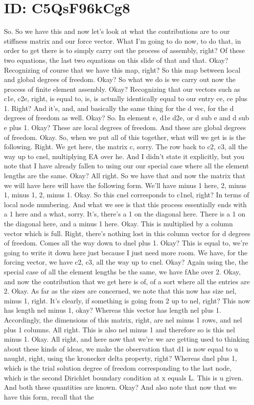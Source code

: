 \documentclass[10pt]{article}
\begin{document}
\section*{ID: C5QsF96kCg8}
So. So we have this and now let's look at what the contributions are to our stiffness matrix and our force vector. What I'm going to do now, to do that, in order to get there is to simply carry out the process of assembly, right? Of these two equations, the last two equations on this slide of that and that. Okay? Recognizing of course that we have this map, right? So this map between local and global degrees of freedom. Okay? So what we do is we carry out now the process of finite element assembly. Okay? Recognizing that our vectors such as c1e, c2e, right, is equal to, is, is actually identically equal to our entry ce, ce plus 1. Right? And it's, and, and basically the same thing for the d vec, for the d degrees of freedom as well. Okay? So. In element e, d1e d2e, or d sub e and d sub e plus 1. Okay? These are local degrees of freedom. And these are global degrees of freedom. Okay. So, when we put all of this together, what will we get is is the following. Right. We get here, the matrix c, sorry. The row back to c2, c3, all the way up to cnel, multiplying EA over he. And I didn't state it explicitly, but you note that I have already fallen to using our our special case where all the element lengths are the same. Okay? All right. So we have that and now the matrix that we will have here will have the following form. We'll have minus 1 here, 2, minus 1, minus 1, 2, minus 1. Okay.  So this cnel corresponds to c1nel, right? In terms of local node numbering. And what we see is that this process essentially ends with a 1 here and a what, sorry. It's, there's a 1 on the diagonal here.  There is a 1 on the diagonal here, and a minus 1 here. Okay. This is multiplied by a column vector which is full. Right, there's nothing lost in this column vector for d degrees of freedom. Comes all the way down to dnel plus 1. Okay? This is equal to, we're going to write it down here just because I just need more room. We have, for the forcing vector, we have c2, c3, all the way up to cnel. Okay? Again using the, the special case of all the element lengths be the same, we have fAhe over 2. Okay, and now the contribution that we get here is of, of a sort where all the entries are 2. Okay. As far as the sizes are concerned, we note that this now has size nel, minus 1, right. It's clearly, if something is going from 2 up to nel, right? This now has length nel minus 1, okay? Whereas this vector has length nel plus 1. Accordingly, the dimensions of this matrix, right, are nel minus 1 rows, and nel plus 1 columns. All right. This is also nel minus 1 and therefore so is this nel minus 1.  Okay. All right, and here now that we're we are getting used to thinking about these kinds of ideas, we make the observation that d1 is now equal to u naught, right, using the kronecker delta property, right? Whereas dnel plus 1, which is the trial solution degree of freedom corresponding to the last node, which is the second Dirichlet boundary condition at x equals L. This is u given. And both these quantities are known. Okay? And also note that now that we have this form, recall that the 
\end{document}
